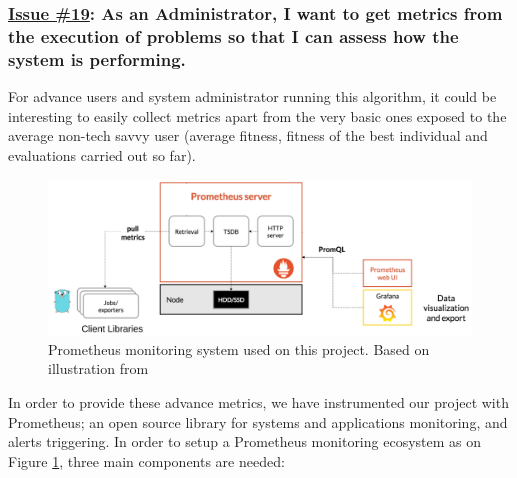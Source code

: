 \subsubsection*{\href{https://github.com/salvacorts/TFG-Parasitic-Metaheuristics/issues/19}{Issue \#19}: As an Administrator, I want to get metrics from the execution of problems so that I can assess how the system is performing.}

For advance users and system administrator running this algorithm, it could be interesting to easily collect metrics apart from the very basic ones exposed to the average non-tech savvy user (average fitness, fitness of the best individual and evaluations carried out so far).

\begin{figure}[h!]
		\centering
    	\includegraphics[width=\linewidth]{assets/images/prometheus-architecture.png}
    	\caption{Prometheus monitoring system used on this project. Based on illustration from \cite{prom-image}}
    	\label{fig:prometheus-ecosystem}
\end{figure}

In order to provide these advance metrics, we have instrumented our project with Prometheus\cite{prometheus}; an open source library for systems and applications monitoring, and alerts triggering. In order to setup a Prometheus monitoring ecosystem as on Figure \ref{fig:prometheus-ecosystem}, three main components are needed:

